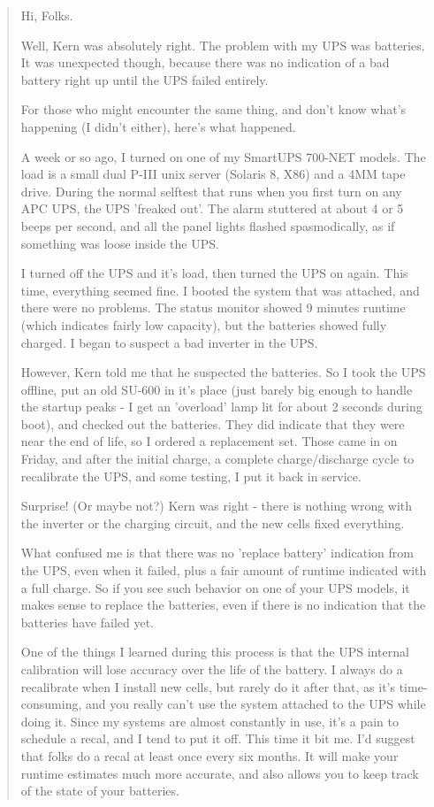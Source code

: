 \begin{quote}

Hi, Folks.  

Well, Kern was absolutely right. The problem with my UPS was batteries. It was
unexpected though, because there was no indication of a bad battery right up
until the UPS failed entirely.  

For those who might encounter the same thing, and don't know what's happening
(I didn't either), here's what happened.  

A week or so ago, I turned on one of my SmartUPS 700-NET models. The load is a
small dual P-III unix server (Solaris 8, X86) and a 4MM tape drive. During the
normal selftest that runs when you first turn on any APC UPS, the UPS 'freaked
out'. The alarm stuttered at about 4 or 5 beeps per second, and all the panel
lights flashed spasmodically, as if something was loose inside the UPS.  

I turned off the UPS and it's load, then turned the UPS on again. This time,
everything seemed fine. I booted the system that was attached, and there were
no problems. The status monitor showed 9 minutes runtime (which indicates
fairly low capacity), but the batteries showed fully charged. I began to
suspect a bad inverter in the UPS.  

However, Kern told me that he suspected the batteries. So I took the UPS
offline, put an old SU-600 in it's place (just barely big enough to handle the
startup peaks - I get an 'overload' lamp lit for about 2 seconds during boot),
and checked out the batteries. They did indicate that they were near the end
of life, so I ordered a replacement set. Those came in on Friday, and after
the initial charge, a complete charge/discharge cycle to recalibrate the UPS,
and some testing, I put it back in service.  

Surprise! (Or maybe not?) Kern was right - there is nothing wrong with the
inverter or the charging circuit, and the new cells fixed everything.  

What confused me is that there was no 'replace battery' indication from the
UPS, even when it failed, plus a fair amount of runtime indicated with a full
charge. So if you see such behavior on one of your UPS models, it makes sense
to replace the batteries, even if there is no indication that the batteries
have failed yet.  

One of the things I learned during this process is that the UPS internal
calibration will lose accuracy over the life of the battery. I always do a
recalibrate when I install new cells, but rarely do it after that, as it's
time-consuming, and you really can't use the system attached to the UPS while
doing it. Since my systems are almost constantly in use, it's a pain to
schedule a recal, and I tend to put it off. This time it bit me. I'd suggest
that folks do a recal at least once every six months. It will make your
runtime estimates much more accurate, and also allows you to keep track of the
state of your batteries.  


\end{quote}
